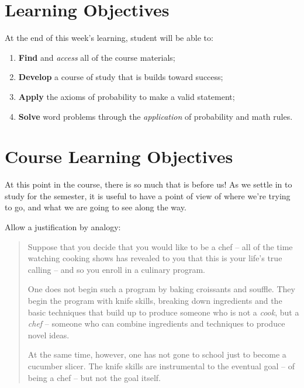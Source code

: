 \documentclass[
]{book}
\providecommand{\tightlist}{%
  \setlength{\itemsep}{0pt}\setlength{\parskip}{0pt}}
\theoremstyle{definition}
\theoremstyle{definition}
\theoremstyle{definition}
\theoremstyle{definition}
\theoremstyle{remark}
\begin{document}
\hypertarget{learning-objectives}{%
\section{Learning Objectives}\label{learning-objectives}}

At the end of this week's learning, student will be able to:

\begin{enumerate}
\def\labelenumi{\arabic{enumi}.}
\tightlist
\item
  \textbf{Find} and \emph{access} all of the course materials;
\item
  \textbf{Develop} a course of study that is builds toward success;
\item
  \textbf{Apply} the axioms of probability to make a valid statement;
\item
  \textbf{Solve} word problems through the \emph{application} of probability and math rules.
\end{enumerate}

\hypertarget{course-learning-objectives}{%
\section{Course Learning Objectives}\label{course-learning-objectives}}

At this point in the course, there is so much that is before us! As we settle in to study for the semester, it is useful to have a point of view of where we're trying to go, and what we are going to see along the way.

Allow a justification by analogy:

\begin{quote}
Suppose that you decide that you would like to be a chef -- all of the time watching cooking shows has revealed to you that this is your life's true calling -- and so you enroll in a culinary program.

One does not begin such a program by baking croissants and souffle. They begin the program with knife skills, breaking down ingredients and the basic techniques that build up to produce someone who is not a \emph{cook}, but a \emph{chef} -- someone who can combine ingredients and techniques to produce novel ideas.

At the same time, however, one has not gone to school just to become a cucumber slicer. The knife skills are instrumental to the eventual goal -- of being a chef -- but not the goal itself.
\end{quote}
\end{document}
